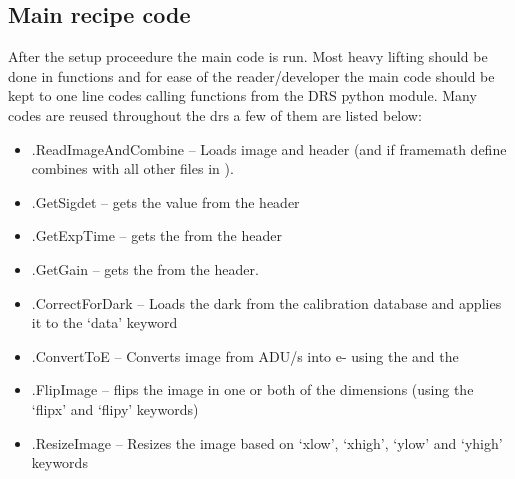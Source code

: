\clearpage
\newpage
\subsection{Main recipe code}
\label{ch:the_recipes:gen_layout:main_recipe_code}

After the setup proceedure the main code is run. Most heavy lifting should be done in functions and for ease of the reader/developer the main code should be kept to one line codes calling functions from the DRS python module. Many codes are reused throughout the drs a few of them are listed below:

\begin{itemize}

	\item \spirouImage.ReadImageAndCombine -- Loads  image and header (and if framemath define combines with all other files in ).

	\item \spirouImage.GetSigdet -- gets the  value from the  header

	\item \spirouImage.GetExpTime -- gets the  from the  header

	\item \spirouImage.GetGain -- gets the  from the  header.

	\item \spirouImage.CorrectForDark -- Loads the dark from the calibration database and applies it to the `data' keyword

	\item \spirouImage.ConvertToE -- Converts image from ADU/s into e- using the  and  the 

	\item \spirouImage.FlipImage -- flips the image in one or both of the dimensions (using the `flipx' and `flipy' keywords)
 
	\item \spirouImage.ResizeImage -- Resizes the image based on `xlow', `xhigh', `ylow' and `yhigh' keywords

\end{itemize}


